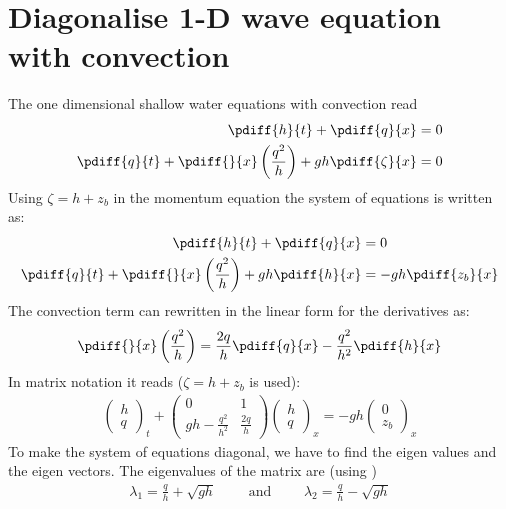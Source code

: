 \chapter{Diagonalise 1-D wave equation with convection}\label{sec:diagonalise_conservative_wave_with_convection}
The one dimensional shallow water equations  with convection
read
%
\begin{align}
    \pdiff{h}{t}  + \pdiff{q}{x} & = 0 \label{eq:continuity_for_diagonalisation}\\
    \pdiff{q}{t}  + \pdiff{}{x} \left( \frac{q^2}{h} \right) + g h \pdiff{\zeta}{x} & = 0 \label{eq:momentum_for_diagonalisation}
\end{align}
Using $\zeta = h + z_b$ in the momentum equation the system of equations is written as:
\begin{align}
    \pdiff{h}{t}  + \pdiff{q}{x} & = 0
    \\
    \pdiff{q}{t}  + \pdiff{}{x} \left( \frac{q^2}{h} \right) + g h \pdiff{h}{x} & = -gh\pdiff{z_b}{x}
\end{align}
The convection term can rewritten in the linear form for the derivatives as:
\begin{align}
    \pdiff{}{x} \left( \frac{q^2}{h} \right) = \frac{2 q}{h} \pdiff{q}{x} - \frac{q^2}{h^2}\pdiff{h}{x}
    \label{eq:convection_linear_form}
\end{align}
In matrix notation it reads ($\zeta = h +z_b$ is used):
\begin{align}
    \begin{pmatrix} h \\ q \end{pmatrix}_t +
    \begin{pmatrix} 0 & 1  \\ gh-\frac{q^2}{h^2} & \frac{2q}{h} \end{pmatrix}
    \begin{pmatrix} h \\ q \end{pmatrix}_x =
    -gh \begin{pmatrix} 0 \\ z_b \end{pmatrix}_x
\end{align}
To make the system of equations diagonal, we have to find the eigen values and the eigen vectors.
The eigenvalues of the matrix are (using \maplesoft)
\begin{align}
    \lambda_1 = \frac{q}{h} + \sqrt{gh} \qquad \mbox{ and } \qquad
    \lambda_2 = \frac{q}{h} - \sqrt{gh}
\end{align}
